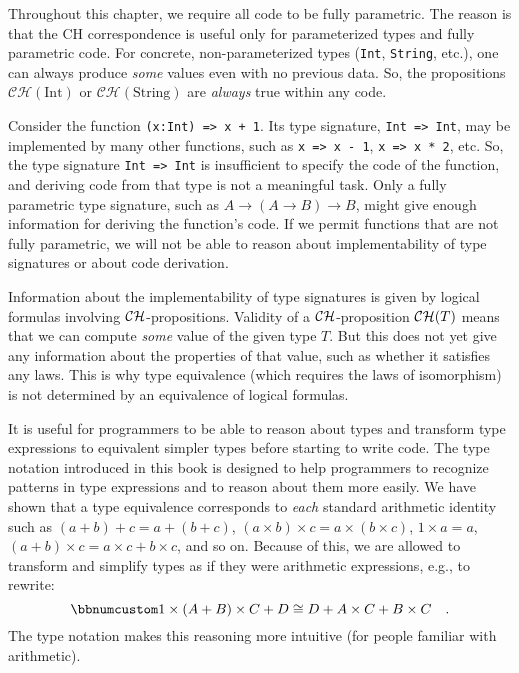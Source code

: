 Throughout this chapter, we require all code to be fully parametric.
The reason is that the CH correspondence is useful only for parameterized
types and fully parametric code. For concrete, non-parameterized types
(\lstinline!Int!, \lstinline!String!, etc.), one can always produce
\emph{some} values even with no previous data. So, the propositions
$\mathcal{CH}(\text{Int})$ or $\mathcal{CH}(\text{String})$ are
\emph{always} true within any code.

Consider the function \lstinline!(x:Int) => x + 1!. Its type signature,
\lstinline!Int => Int!, may be implemented by many other functions,
such as \lstinline!x => x - 1!, \lstinline!x => x * 2!, etc. So,
the type signature \lstinline!Int => Int! is insufficient to specify
the code of the function, and deriving code from that type is not
a meaningful task. Only a fully parametric type signature, such as
$A\rightarrow\left(A\rightarrow B\right)\rightarrow B$, might give
enough information for deriving the function\textsf{'}s code. If we permit
functions that are not fully parametric, we will not be able to reason
about implementability of type signatures or about code derivation.

Information about the implementability of type signatures is given
by logical formulas involving ${\cal CH}$-propositions. Validity
of a ${\cal CH}$-proposition ${\cal CH}(T)$ means that we can compute
\emph{some} value of the given type $T$. But this does not yet give
any information about the properties of that value, such as whether
it satisfies any laws. This is why type equivalence (which requires
the laws of isomorphism) is not determined by an equivalence of logical
formulas.

It is useful for programmers to be able to reason about types and
transform type expressions to equivalent simpler types before starting
to write code. The type notation introduced in this book is designed
to help programmers to recognize patterns in type expressions and
to reason about them more easily. We have shown that a type equivalence
corresponds to \emph{each} standard arithmetic identity such as $\left(a+b\right)+c=a+\left(b+c\right)$,
$\left(a\times b\right)\times c=a\times(b\times c)$, $1\times a=a$,
$\left(a+b\right)\times c=a\times c+b\times c$, and so on. Because
of this, we are allowed to transform and simplify types as if they
were arithmetic expressions, e.g., to rewrite:
\[
\bbnum 1\times\left(A+B\right)\times C+D\cong D+A\times C+B\times C\quad.
\]
The type notation makes this reasoning more intuitive (for people
familiar with arithmetic). 

